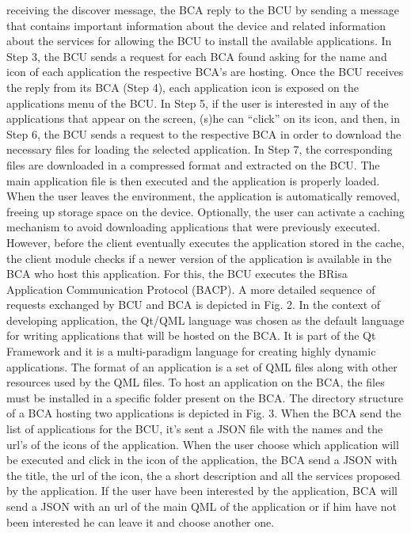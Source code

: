 \documentclass[journal]{IEEEtran}
\begin{document}
receiving the discover message, the BCA reply to the BCU by sending a message that contains important information about the device and related information about the services for allowing the BCU to install the available applications. In Step 3, the BCU sends a request for each BCA found asking for the name and icon of each application the respective BCA’s are hosting. Once the BCU receives the reply from its BCA (Step 4), each application icon is exposed on the applications menu of the BCU. In Step 5, if the user is interested in any of the applications that appear on the screen, (s)he can “click” on its icon, and then, in Step 6, the BCU sends a request to the respective BCA in order to download the necessary ﬁles for loading the selected application. In Step 7, the corresponding ﬁles are downloaded in a compressed format and extracted on the BCU. The main application ﬁle is then executed and the application is properly loaded. When the user leaves the environment, the application is automatically removed, freeing up storage space on the device.
Optionally, the user can activate a caching mechanism to avoid downloading applications that were previously executed. However, before the client eventually executes the application stored in the cache, the client module checks if a newer version of the application is available in the BCA who host this application. For this, the  BCU executes the BRisa Application Communication Protocol (BACP). A more detailed sequence of requests exchanged by BCU and BCA is depicted in Fig. 2.
In the context of developing application, the Qt/QML language was chosen as the default language for writing applications that will be hosted on the BCA. It is part of the Qt Framework and it is a multi-paradigm language for creating highly dynamic applications.
The format of an application is a set of QML ﬁles along with other resources used by the QML ﬁles. To host an application on the BCA, the ﬁles must be installed in a speciﬁc folder present on the BCA. The directory structure of a BCA hosting two applications is depicted in Fig. 3. When the BCA send the list of applications for the BCU, it’s sent a JSON file with the names and the url’s of the icons of the application. When the user choose which application will be executed and click in the icon of the application, the BCA send a JSON with the title, the url of the icon, the a short description and all the services proposed by the application. If the user have been interested by the application, BCA will send a JSON with an url of the main QML of the application or if him have not been interested he can leave it and choose another one.
\end{document}
